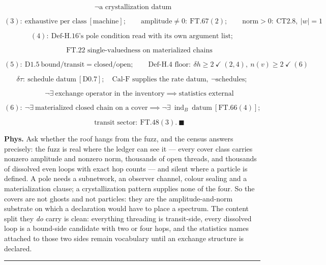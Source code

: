 \begin{theorem}
\[
\ \neg\text{a crystallization datum}
\]

\[
(3):\ \text{exhaustive per class}\ [\text{machine}];\qquad\text{amplitude}\ne0:\ \mathrm{FT.67}(2);\qquad\text{norm}>0:\ \mathrm{CT2.8},\ |w|=1
\]

\[
(4):\ \text{Def-H.16's pole condition read with its own argument list};
\]

\[
\qquad \text{FT.22 single-valuedness on materialized chains}
\]

\[
(5):\ \mathrm{D1.5}\ \text{bound/transit}=\text{closed/open};\qquad\text{Def-H.4 floor}:\ \delta h\ge2\ \checkmark\ (2,4),\ n(v)\ge2\ \checkmark\ (6)
\]

\[
\delta\tau:\ \text{schedule datum}\ [\mathrm{D0.7}];\quad\text{Cal-F supplies the rate datum},\ \neg\text{schedules};
\]

\[
\qquad \neg\exists\ \text{exchange operator in the inventory}\implies\text{statistics external}
\]

\[
(6):\ \neg\exists\ \text{materialized closed chain on a cover}\implies\neg\exists\ \operatorname{ind}_B\ \text{datum}\ [\mathrm{FT.66}(4)];
\]

\[
\qquad \text{transit sector}:\ \mathrm{FT.48}(3).\ \blacksquare
\]

\textbf{Phys.} Ask whether the roof hangs from the fuzz, and the census answers precisely: the fuzz is real where the ledger can see it — every cover class carries nonzero amplitude and nonzero norm, thousands of open threads, and thousands of dissolved even loops with exact hop counts — and silent where a particle is defined. A pole needs a subnetwork, an observer channel, colour sealing and a materialization clause; a crystallization pattern supplies none of the four. So the covers are not ghosts and not particles: they are the amplitude-and-norm substrate on which a declaration would have to place a spectrum. The content split they \textit{do} carry is clean: everything threading is transit-side, every dissolved loop is a bound-side candidate with two or four hops, and the statistics names attached to those two sides remain vocabulary until an exchange structure is declared.

\vspace{2pt}\noindent\rule{\textwidth}{0.4pt}\vspace{2pt}

\end{theorem}

